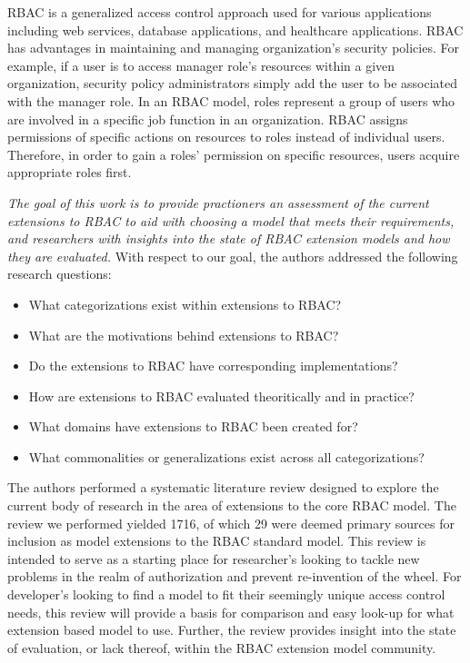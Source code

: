 RBAC is a generalized access control approach used for various applications including web services, 
database applications, and healthcare applications.  RBAC has advantages in maintaining and managing organization's security policies.  
For example, if a user is to access manager role's resources within a given organization, security policy administrators simply add the user to be associated with the manager role.
In an RBAC model, roles represent a group of users who are involved in a specific job function in an organization. RBAC assigns permissions 
of specific actions on resources to roles instead of individual users. Therefore, in order to gain a roles' permission on specific resources, 
users acquire appropriate roles first.  

\textit{The goal of this work is to provide practioners an assessment of the current extensions to RBAC to aid with choosing a model that meets their requirements, and researchers with insights into the state of RBAC extension models and how they are evaluated.} With respect to our goal, the authors addressed the following research questions:

\begin{itemize}
\setlength{\itemsep}{0.25pt}
\item What categorizations exist within extensions to RBAC?
\item What are the motivations behind extensions to RBAC?
\item Do the extensions to RBAC have corresponding implementations?
\item How are extensions to RBAC evaluated theoritically and in practice?
\item What domains have extensions to RBAC been created for?
\item What commonalities or generalizations exist across all categorizations?
\end{itemize}

The authors performed a systematic literature review designed to explore the current body of research in the area of extensions to the core RBAC model.  The review we performed yielded 1716, of which 29 were deemed primary sources for inclusion as model extensions to the RBAC standard model.  This review is intended to serve as a starting place for researcher's looking to tackle new problems in the realm of authorization and prevent re-invention of the wheel. For developer's looking to find a model to fit their seemingly unique access control needs, this review will provide a basis for comparison and easy look-up for what extension based model to use.  Further, the review provides insight into the state of evaluation, or lack thereof, within the RBAC extension model community.

